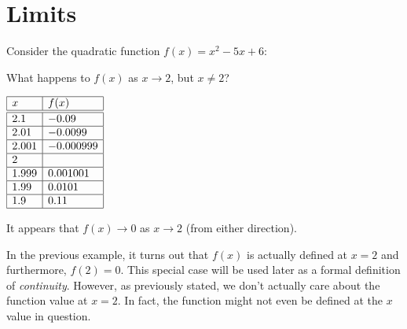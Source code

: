 \documentclass[letterpaper,12pt,fleqn]{article}
\begin{document}
\section*{Limits}

\begin{example}

  Consider the quadratic function \(f(x)=x^2-5x+6\):

  \bigskip

  \begin{center}
  \end{center}

  What happens to \(f(x)\) as \(x\to2\), but \(x\ne 2\)?

  \bigskip

  \begin{center}
    \(\begin{array}{|l|l|}
    \hline
    x & f(x) \\
    \hline
    \hline
    2.1 & -0.09 \\
    \hline
    2.01 & -0.0099 \\
    \hline
    2.001 & -0.000999 \\
    \hline
    2 & \\
    \hline
    1.999 & 0.001001 \\
    \hline
    1.99 & 0.0101 \\
    \hline
    1.9 & 0.11 \\
    \hline
    \end{array}\)
  \end{center}

  \bigskip

  It appears that \(f(x)\to0\) as \(x\to2\) (from either direction).
\end{example}

In the previous example, it turns out that \(f(x)\) is actually defined at \(x=2\) and furthermore, \(f(2)=0\).
This special case will be used later as a formal definition of \emph{continuity}.  However, as previously stated,
we don't actually care about the function value at \(x=2\).  In fact, the function might not even be defined at the
\(x\) value in question.
\end{document}
